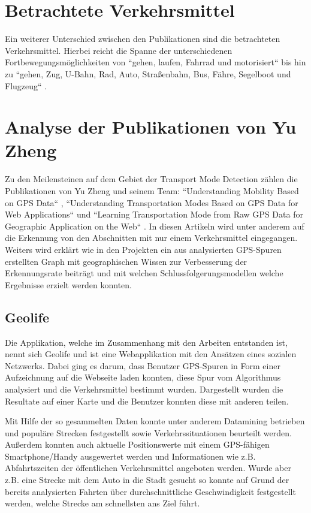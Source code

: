 \section{Betrachtete Verkehrsmittel}
Ein weiterer Unterschied zwischen den Publikationen sind die betrachteten Verkehrsmittel. Hierbei reicht die Spanne der unterschiedenen Fortbewegungsmöglichkeiten von ``gehen, laufen, Fahrrad und motorisiert`` \cite{reddy_using_2010} bis hin zu ``gehen, Zug, U-Bahn, Rad, Auto, Straßenbahn, Bus, Fähre, Segelboot und Flugzeug`` \cite{biljecki_transportation_2013}.

\section{Analyse der Publikationen von Yu Zheng}
Zu den Meilensteinen auf dem Gebiet der Transport Mode Detection zählen die Publikationen von Yu Zheng und seinem Team: ``Understanding Mobility Based on GPS Data`` \cite{zheng_understanding_2008}, ``Understanding Transportation Modes Based on GPS Data for Web Applications`` \cite{zheng_understanding_2010} und ``Learning Transportation Mode from Raw GPS Data for Geographic Application on the Web`` \cite{zheng_learning_2008}. In diesen Artikeln wird unter anderem auf die Erkennung von den Abschnitten mit nur einem Verkehrsmittel eingegangen. Weiters wird erklärt wie in den Projekten ein aus analysierten GPS-Spuren erstellten Graph mit geographischen Wissen zur Verbesserung der Erkennungsrate beiträgt und mit welchen Schlussfolgerungsmodellen welche Ergebnisse erzielt werden konnten. 

\subsection{Geolife}
Die Applikation, welche im Zusammenhang mit den Arbeiten entstanden ist, nennt sich Geolife und ist eine Webapplikation mit den Ansätzen eines sozialen Netzwerks. Dabei ging es darum, dass Benutzer GPS-Spuren in Form einer Aufzeichnung auf die Webseite laden konnten, diese Spur vom Algorithmus analysiert und die Verkehrsmittel bestimmt wurden. Dargestellt wurden die Resultate auf einer Karte und die Benutzer konnten diese mit anderen teilen.

Mit Hilfe der so gesammelten Daten konnte unter anderem Datamining betrieben und populäre Strecken festgestellt sowie Verkehrssituationen beurteilt werden. Außerdem konnten auch aktuelle Positionswerte mit einem GPS-fähigen Smartphone/Handy ausgewertet werden und Informationen wie z.B. Abfahrtszeiten der öffentlichen Verkehrsmittel angeboten werden. Wurde aber z.B. eine Strecke mit dem Auto in die Stadt gesucht so konnte auf Grund der bereits analysierten Fahrten über durchschnittliche Geschwindigkeit festgestellt werden, welche Strecke am schnellsten ans Ziel führt.


